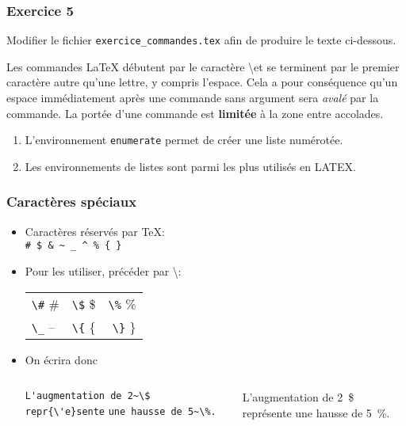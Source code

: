 
\begin{frame}

	\frametitle{Exercice 5}
	
	Modifier le fichier \texttt{exercice\_commandes.tex} afin de produire le
	texte ci-dessous.
	
	{\rmfamily Les commandes {\LaTeX} débutent par le caractère \textbackslash et se terminent par le
		premier caractère autre qu’une lettre, y compris l’espace. Cela a pour conséquence
		qu’un espace immédiatement après une commande sans argument	sera \emph{avalé} par la commande.
		La portée d’une commande est \textbf{limitée} à la zone entre accolades.
		
		\begin{enumerate}
			\item L’environnement \texttt{enumerate} permet de créer une liste numérotée.
			\item Les environnements de listes sont parmi les plus utilisés en LATEX.
		\end{enumerate}
	}
\end{frame}


\begin{frame}[fragile]

	\frametitle{Caractères spéciaux}
	
	\begin{itemize}
		\item Caractères réservés par \TeX  : \\
		\lstinline|# $ & ~ _ ^ % { }|
		
		\item Pour les utiliser, précéder par \textbackslash  :\\
		\begin{tabular}{lcr}
			\lstinline|\#|  \#	&	\lstinline|\$|  \$	&	\lstinline|\%|  \% \\
			\lstinline|\_|  --	&	\lstinline|\{|  \{	&	\lstinline|\}|  \}
		\end{tabular}
	
		\item On écrira donc
		
		\begin{columns}
			
			\lstinline|L'augmentation de 2~\$ repr{\'e}sente|
			\lstinline|une hausse de 5~\%.|
			
			
			L’augmentation de 2~\$ représente une hausse de 5~\%.
		\end{columns}
	\end{itemize}

\end{frame}


